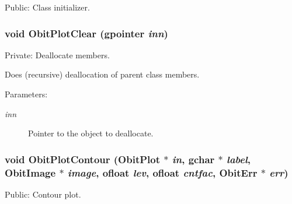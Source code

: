 Public: Class initializer. 

\subsubsection{\setlength{\rightskip}{0pt plus 5cm}void Obit\-Plot\-Clear (gpointer {\em inn})}\label{ObitPlot_8c_a4}


Private: Deallocate members. 

Does (recursive) deallocation of parent class members. \begin{Desc}
\item[Parameters:]
\begin{description}
\item[{\em inn}]Pointer to the object to deallocate. \end{description}
\end{Desc}
\subsubsection{\setlength{\rightskip}{0pt plus 5cm}void Obit\-Plot\-Contour ({\bf Obit\-Plot} $\ast$ {\em in}, gchar $\ast$ {\em label}, {\bf Obit\-Image} $\ast$ {\em image}, {\bf ofloat} {\em lev}, {\bf ofloat} {\em cntfac}, {\bf Obit\-Err} $\ast$ {\em err})}\label{ObitPlot_8c_a12}


Public: Contour plot. 

